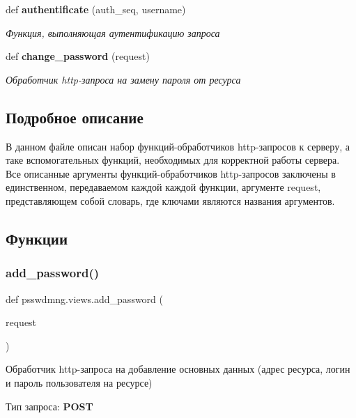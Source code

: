 \begin{DoxyCompactItemize}
def \textbf{ authentificate} (auth\+\_\+seq, username)
\begin{DoxyCompactList}\small\item\em Функция, выполняющая аутентификацию запроса ~\newline
 \end{DoxyCompactList}\item 
def \textbf{ change\+\_\+password} (request)
\begin{DoxyCompactList}\small\item\em Обработчик http-\/запроса на замену пароля от ресурса \end{DoxyCompactList}\end{DoxyCompactItemize}


\subsection{Подробное описание}
\begin{DoxyVerb}В данном файле описан набор функций-обработчиков http-запросов к серверу, а таке вспомогательных функций, необходимых для корректной работы сервера.
Все описанные аргументы функций-обработчиков http-запросов заключены в единственном, передаваемом каждой каждой функции, аргументе request, представляющем
собой словарь, где ключами являются названия аргументов.
\end{DoxyVerb}
 

\subsection{Функции}
\mbox{\label{namespacepsswdmng_1_1views_a7e2a55793835ef1cde007d8d2f6d3520}} 
\subsubsection{add\+\_\+password()}
{\footnotesize\ttfamily def psswdmng.\+views.\+add\+\_\+password (\begin{DoxyParamCaption}\item[{}]{request }\end{DoxyParamCaption})}



Обработчик http-\/запроса на добавление основных данных (адрес ресурса, логин и пароль пользователя на ресурсе) 

Тип запроса\+: {\bfseries P\+O\+ST} 

